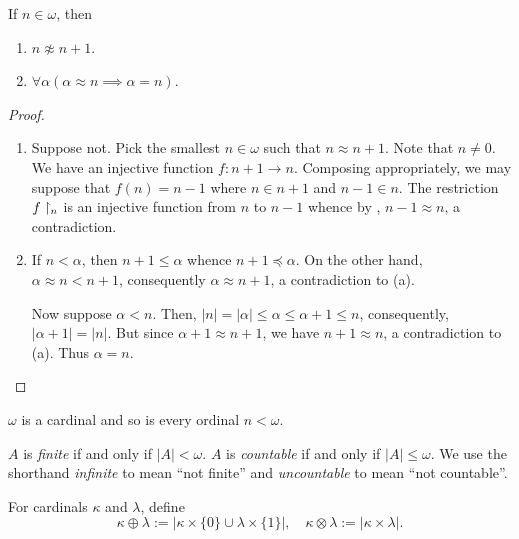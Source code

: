 \begin{lemma}
    If $n\in\omega$, then 
    \begin{enumerate}[label=(\alph*)]
        \item $n\not\approx n + 1$. 
        \item $\forall\alpha(\alpha\approx n\implies\alpha = n)$.
    \end{enumerate}
\end{lemma}
\begin{proof}
\begin{enumerate}[label=(\alph*)]
    \item Suppose not. Pick the smallest $n\in\omega$ such that $n\approx n + 1$. Note that $n\ne 0$. We have an injective function $f: n + 1\to n$. Composing appropriately, we may suppose that $f(n) = n - 1$ where $n\in n + 1$ and $n - 1\in n$. The restriction $f\upharpoonright_n$ is an injective function from $n$ to $n - 1$ whence by , $n - 1\approx n$, a contradiction. 

    \item If $n < \alpha$, then $n + 1\le\alpha$ whence $n + 1\preceq\alpha$. On the other hand, $\alpha\approx n < n + 1$, consequently $\alpha\approx n + 1$, a contradiction to (a). 

    Now suppose $\alpha < n$. Then, $|n| = |\alpha|\le\alpha\le\alpha + 1\le n$, consequently, $|\alpha + 1| = |n|$. But since $\alpha + 1\approx n + 1$, we have $n + 1\approx n$, a contradiction to (a). Thus $\alpha = n$. \qedhere
\end{enumerate}
\end{proof}

\begin{corollary}
    $\omega$ is a cardinal and so is every ordinal $n < \omega$.
\end{corollary}

\begin{definition}
    $A$ is \emph{finite} if and only if $|A| < \omega$. $A$ is \emph{countable} if and only if $|A|\le\omega$. We use the shorthand \emph{infinite} to mean ``not finite'' and \emph{uncountable} to mean ``not countable''.
\end{definition}

\begin{definition}
    For cardinals $\kappa$ and $\lambda$, define 
    \begin{equation*}
        \kappa\oplus\lambda := |\kappa\times\{0\}\cup\lambda\times\{1\}|,\quad\kappa\otimes\lambda := |\kappa\times\lambda|.
    \end{equation*}
\end{definition}

